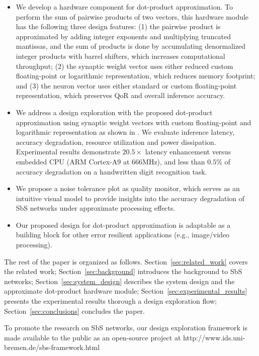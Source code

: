 \begin{itemize}
	\item We develop a hardware component for dot-product approximation. To perform the sum of pairwise products of two vectors, this hardware module has the following three design features: (1) the pairwise product is approximated by adding integer exponents and multiplying truncated mantissas, and the sum of products is done by accumulating denormalized integer products with barrel shifters, which increases computational throughput; (2) the synaptic weight vector uses either reduced custom floating-point or logarithmic representation, which reduces memory footprint; and (3) the neuron vector uses either standard or custom floating-point representation, which preserves QoR and overall inference accuracy.
	\item We address a design exploration with the proposed dot-product approximation using synaptic weight vectors with custom floating-point and logarithmic representation as shown in . We evaluate inference latency, accuracy degradation, resource utilization and power dissipation. Experimental results demonstrate $20.5\times$ latency enhancement versus embedded CPU (ARM Cortex-A9 at $666$MHz), and less than $0.5\%$ of accuracy degradation on a handwritten digit recognition task. 
	\item We propose a noise tolerance plot as quality monitor, which serves as an intuitive visual model to provide insights into the accuracy degradation of SbS networks under approximate processing effects.
	\item Our proposed design for dot-product approximation is adaptable as a building block for other error resilient applications (e.g., image/video processing).
\end{itemize}


The rest of the paper is organized as follows. Section~\ref{sec:related_work} covers the related work; Section~\ref{sec:background} introduces the background to SbS networks; Section~\ref{sec:system_design} describes the system design and the approximate dot-product hardware module; Section~\ref{sec:experimental_results} presents the experimental results thorough a design exploration flow; Section~\ref{sec:conclusions} concludes the paper.


To promote the research on SbS networks, our design exploration framework is made available to the public as an open-source project at http://www.ids.uni-bremen.de/sbs-framework.html

